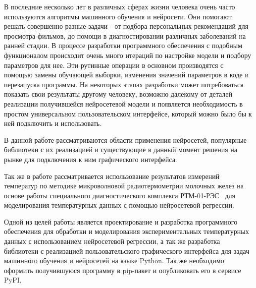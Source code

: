 \intro
В последние несколько лет в различных сферах жизни человека очень часто используются алгоритмы машинного обучения и нейросети. Они помогают решать совершенно разные задачи - от подбора персональных рекомендаций для просмотра фильмов, до помощи в диагностировании различных заболеваний на ранней стадии. В процессе разработки программного обеспечения с подобным функционалом происходит очень много итераций по настройке модели и подбору параметров для нее. Эти рутинные операции в основном производятся с помощью замены обучающей выборки, изменения значений параметров в коде и перезапуска программы. На некоторых этапах разработки может потребоваться показать свои результаты другому человеку, возможно далекому от деталей реализации получившейся нейросетевой модели и появляется необходимость в простом универсальном пользовательском интерфейсе, который можно было бы к ней подключить и использовать.

В данной работе рассматриваются области применения нейросетей, популярные библиотеки с их реализацией и существующие в данный момент решения на рынке для подключения к ним графического интерфейса. 

Так же в работе рассматривается использование результатов измерений температур по методике микроволновой радиотермометрии молочных желез на основе работы специального диагностического комплекса РТМ-01-РЭС~\cite{problemiIzmereniyaVolsu} для моделирования температурных данных с помощью нейросетевой регрессии. 

Одной из целей работы является проектирование и разработка программного обеспечения для обработки и моделирования экспериментальных температурных данных с использованием нейросетевой регрессии, а так же разработка библиотеки с реализацией пользовательского графического интерфейса для задач машинного обучения и нейросетей на языке Python. Так же необходимо оформить получившуюся программу в pip-пакет и опубликовать его в сервисе PyPI.